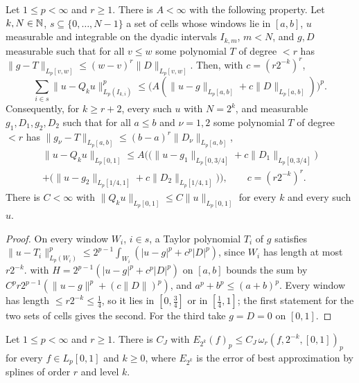 \begin{lemma}
\label{lem:qi-taylor}
\leanok
{}
Let $1 \leq p < \infty$ and $r \geq 1$. There is $A < \infty$ with the following property. Let
$k, N \in \mathbb{N}$, $s \subseteq \{0, \dots, N - 1\}$ a set of cells whose windows lie in $[a, b]$,
$u$ measurable and integrable on the dyadic intervals $I_{k,m}$, $m < N$, and $g, D$ measurable
such that for all $v \leq w$ some polynomial $T$ of degree $< r$ has
$\|g - T\|_{L_p[v,w]} \leq (w - v)^r \|D\|_{L_p[v,w]}$. Then, with $c = (r 2^{-k})^r$,
\[
  \sum_{i \in s} \|u - Q_k u\|_{L_p(I_{k,i})}^p \leq
  \bigl(A (\|u - g\|_{L_p[a,b]} + c \|D\|_{L_p[a,b]})\bigr)^p .
\]
Consequently, for $k \geq r + 2$, every such $u$ with $N = 2^k$, and measurable
$g_1, D_1, g_2, D_2$ such that for all $a \leq b$ and $\nu = 1, 2$ some polynomial $T$ of degree
$< r$ has $\|g_\nu - T\|_{L_p[a,b]} \leq (b - a)^r \|D_\nu\|_{L_p[a,b]}$,
\begin{multline*}
  \|u - Q_k u\|_{L_p[0,1]} \leq A \bigl( \bigl( \|u - g_1\|_{L_p[0,3/4]}
    + c \|D_1\|_{L_p[0,3/4]} \bigr) \\
  + \bigl( \|u - g_2\|_{L_p[1/4,1]} + c \|D_2\|_{L_p[1/4,1]} \bigr) \bigr) ,
  \qquad c = (r 2^{-k})^r .
\end{multline*}
There is $C < \infty$ with $\|Q_k u\|_{L_p[0,1]} \leq C \|u\|_{L_p[0,1]}$ for every $k$ and every
such $u$.
\end{lemma}

\begin{proof}
\leanok
On every window $W_i$, $i \in s$, a Taylor polynomial $T_i$ of $g$ satisfies
$\|u - T_i\|_{L_p(W_i)}^p \leq 2^{p-1} \int_{W_i} (|u - g|^p + c^p |D|^p)$, since $W_i$ has length
at most $r 2^{-k}$.  with $H = 2^{p-1} (|u - g|^p + c^p |D|^p)$ on
$[a, b]$ bounds the sum by $C^p r 2^{p-1} (\|u - g\|^p + (c \|D\|)^p)$, and
$a^p + b^p \leq (a + b)^p$. Every window has length $\leq r 2^{-k} \leq \tfrac14$, so it lies in
$[0, \tfrac34]$ or in $[\tfrac14, 1]$; the first statement for the two sets of cells gives the
second. For the third take $g = D = 0$ on $[0, 1]$.
\end{proof}

\begin{theorem}
\label{thm:spline-jackson}
\leanok
{}
Let $1 \leq p < \infty$ and $r \geq 1$. There is $C_J$ with
$E_{2^k}(f)_p \leq C_J \, \omega_r(f, 2^{-k}, [0, 1])_p$ for every $f \in L_p[0,1]$ and $k \geq 0$,
where $E_{2^k}$ is the error of best approximation by splines of order $r$ and level $k$.
\end{theorem}

